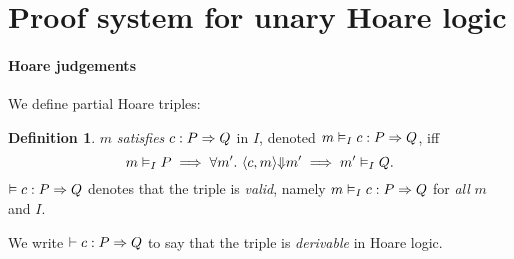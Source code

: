 \documentclass[10pt]{article}
\theoremstyle{definition}
\newtheorem{definition}{Definition}
\begin{document}





\section{Proof system for unary Hoare logic}

\paragraph{Hoare judgements}
We define partial Hoare triples:
\begin{definition}
    $m$ \emph{satisfies}
    $\Triple c : P => Q$ in $I$,
    denoted $\AVALmi \Triple c : P => Q$,
    iff    
    $$\AVALmi P \implies \forall m'.\
    \Yields(c,m,m') \implies
    \AVAL m'|I|-Q.$$
%
$\AVALU \Triple c : P => Q$ denotes
that the triple is \emph{valid},
namely $\AVALmi \Triple c : P => Q$
for \emph{all} $m$ and $I$.
\end{definition}

We write $\DER \Triple c : P => Q$ to say that
the triple is \emph{derivable} in Hoare logic.

\iffalse
\begin{displaymath}
\begin{array}{lcl}
    \Triple c : P => Q
    & \triangleq &
    \forall m \in P, m'.\
    \Cfg(c,m) \sstepstotrans \Cfg(\Skip,m') \implies
    m' \in Q
\end{array}
\end{displaymath}
\fi
\end{document}
